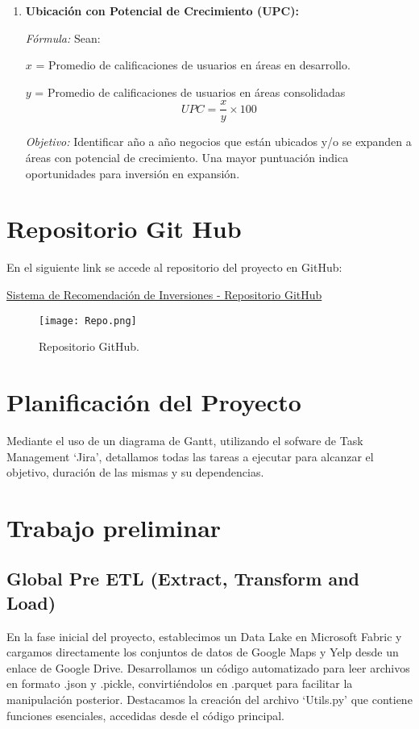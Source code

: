 \documentclass[12pt]{article}
\begin{document}
\begin{enumerate}
    \item \textbf{Ubicación con Potencial de Crecimiento (UPC):}
    
    \textit{Fórmula:} Sean:

    $x$ = Promedio de calificaciones de usuarios en áreas en desarrollo.
    
    $y$ = Promedio de calificaciones de usuarios en áreas consolidadas
    $$ UPC = \frac{x}{y}\times 100$$
    
    \textit{Objetivo:} Identificar año a año negocios que están ubicados y/o se expanden a áreas con potencial de crecimiento. Una mayor puntuación indica oportunidades para inversión en expansión.
    
\end{enumerate}

\section{Repositorio Git Hub}

En el siguiente link se accede al repositorio del proyecto en GitHub:

\href{https://github.com/leocortes85/Invesment_Recomendation_Project}{Sistema de Recomendación de Inversiones - Repositorio GitHub}

\begin{figure}[H]
  \centering
  \texttt{[image: Repo.png]}
  \caption{Repositorio GitHub.}
  \label{fig:Repositorio GitHub}
\end{figure}

\section{Planificación del Proyecto}

Mediante el uso de un diagrama de Gantt, utilizando el sofware de Task Management `Jira', 
 detallamos todas las tareas a ejecutar para alcanzar el objetivo, duración de las mismas y su dependencias.



\section{Trabajo preliminar}
\subsection{Global Pre ETL (Extract, Transform and Load)}
En la fase inicial del proyecto, establecimos un Data Lake en Microsoft Fabric y cargamos directamente los conjuntos de datos de Google Maps y Yelp desde un enlace de Google Drive. Desarrollamos un código automatizado para leer archivos en formato .json y .pickle, convirtiéndolos en .parquet para facilitar la manipulación posterior. Destacamos la creación del archivo `Utils.py' que contiene funciones esenciales, accedidas desde el código principal.
\end{document}

